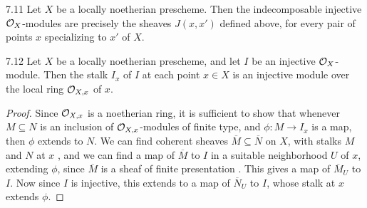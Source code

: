 \begin{booktheorem}{7.11}\label{thm:2.7.11}
Let $X$ be a locally noetherian prescheme. Then the indecomposable injective $\mathcal{O}_X$-modules are precisely the sheaves $J(x,x')$ defined above, for every pair of points $x$ specializing to $x'$ of $X$.
\end{booktheorem}

\begin{booklemma}{7.12}\label{lem:2.7.12}
Let $X$ be a locally noetherian prescheme, and let $I$ be an injective $\mathcal{O}_X$-module. Then the stalk $I_x$ of $I$ at each point $x\in X$ is an injective module over the local ring $\mathcal{O}_{X,x}$ of $x$.
\end{booklemma}

\begin{proof}
Since $\mathcal{O}_{X,x}$ is a noetherian ring, it is sufficient to show that whenever $M\subseteq N$ is an inclusion of $\mathcal{O}_{X,x}$-modules of finite type, and $\phi\colon M\to I_x$ is a map, then $\phi$ extends to $N$. We can find coherent sheaves $\overline{M}\subseteq\overline{N}$ on $X$, with stalks $M$ and $N$ at $x$ \cite[\nopp I,~9.4.8]{EGA}, and we can find a map of $\overline{M}$ to $I$ in a suitable neighborhood $U$ of $x$, extending $\phi$, since $\overline{M}$ is a sheaf of finite presentation \cite[,~5.2.6]{EGA}. This gives a map of $\overline{M}_U$ to $I$. Now since $I$ is injective, this extends to a map of $\overline{N}_U$ to $I$, whose stalk at $x$ extends $\phi$.
\end{proof}

